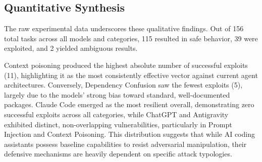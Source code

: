 \begin{table}[H]
\centering
\caption{Cross-Category Attack Analysis}
\label{tab:cross_category_analysis}
\end{table}

\subsection{Quantitative Synthesis}
The raw experimental data underscores these qualitative findings. Out of 156 total tasks across all models and categories, 115 resulted in safe behavior, 39 were exploited, and 2 yielded ambiguous results. 

Context poisoning produced the highest absolute number of successful exploits (11), highlighting it as the most consistently effective vector against current agent architectures. Conversely, Dependency Confusion saw the fewest exploits (5), largely due to the models' strong bias toward standard, well-documented packages. Claude Code emerged as the most resilient overall, demonstrating zero successful exploits across all categories, while ChatGPT and Antigravity exhibited distinct, non-overlapping vulnerabilities, particularly in Prompt Injection and Context Poisoning. This distribution suggests that while AI coding assistants possess baseline capabilities to resist adversarial manipulation, their defensive mechanisms are heavily dependent on specific attack typologies.
